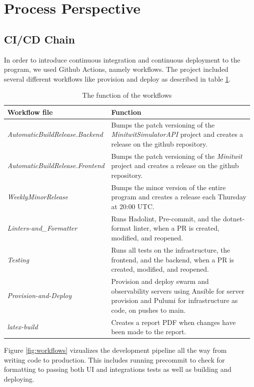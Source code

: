 \section{Process Perspective}

\subsection{CI/CD Chain}

In order to introduce continuous integration and continuous deployment to the program, we used Github Actions, namely workflows. The project included several different workflows like provision and deploy as described in table \ref{tab:workflows}.

\begin{table}[H]
    \tiny
    \centering
    \begin{tabular}{l|l}
        \textbf{Workflow file} & \textbf{Function}\\
        \hline
        \textit{AutomaticBuildRelease.Backend} &  Bumps the patch versioning of the \textit{MinitwitSimulatorAPI} project and creates a release on the github repository.\\
        \textit{AutomaticBuildRelease.Frontend} & Bumps the patch versioning of the \textit{Minitwit} project and creates a release on the github repository.\\
        \textit{WeeklyMinorRelease} & Bumps the minor version of the entire program and creates a release each Thursday at 20:00 UTC.\\
        \textit{Linters-and\_Formatter} & Runs Hadolint, Pre-commit, and the dotnet-format linter, when a PR is created, modified, and reopened.\\
        \textit{Testing} & Runs all tests on the infrastructure, the frontend, and the backend, when a PR is created, modified, and reopened.\\
        \textit{Provision-and-Deploy} & Provision and deploy swarm and observability servers using Ansible for server provision and Pulumi for infrastructure as code, on pushes to main.\\
        \textit{latex-build} & Creates a report PDF when changes have been made to the report.
    \end{tabular}
    \caption{The function of the workflows}
    \label{tab:workflows}
\end{table}

Figure \ref{fig:workflows} vizualizes the development pipeline all the way from writing code to production. This includes running precommit to check for formatting to passing both UI and integrations tests as well as building and deploying.

